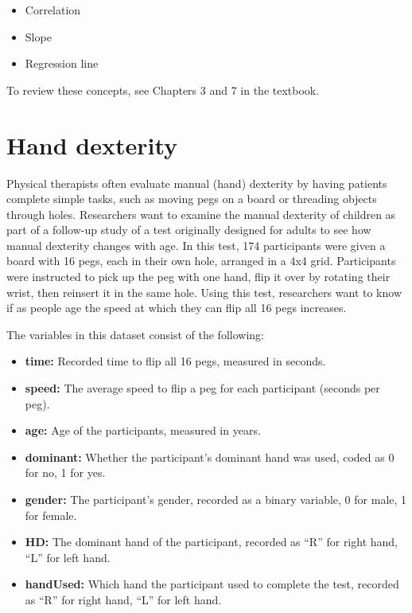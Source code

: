 \documentclass[
]{report}
\begin{document}
\begin{itemize}
\item
  Correlation
\item
  Slope
\item
  Regression line
\end{itemize}

To review these concepts, see Chapters 3 and 7 in the textbook.

\hypertarget{hand-dexterity-1}{%
\section{Hand dexterity}\label{hand-dexterity-1}}

Physical therapists often evaluate manual (hand) dexterity by having patients complete simple tasks, such as moving pegs on a board or threading objects through holes. Researchers want to examine the manual dexterity of children as part of a follow-up study of a test originally designed for adults to see how manual dexterity changes with age. In this test, 174 participants were given a board with 16 pegs, each in their own hole, arranged in a 4x4 grid. Participants were instructed to pick up the peg with one hand, flip it over by rotating their wrist, then reinsert it in the same hole. Using this test, researchers want to know if as people age the speed at which they can flip all 16 pegs increases.

The variables in this dataset consist of the following:

\begin{itemize}
\item
  \textbf{time:} Recorded time to flip all 16 pegs, measured in seconds.
\item
  \textbf{speed:} The average speed to flip a peg for each participant (seconds per peg).
\item
  \textbf{age:} Age of the participants, measured in years.
\item
  \textbf{dominant:} Whether the participant's dominant hand was used, coded as 0 for no, 1 for yes.
\item
  \textbf{gender:} The participant's gender, recorded as a binary variable, 0 for male, 1 for female.
\item
  \textbf{HD:} The dominant hand of the participant, recorded as ``R'' for right hand, ``L'' for left hand.
\item
  \textbf{handUsed:} Which hand the participant used to complete the test, recorded as ``R'' for right hand, ``L'' for left hand.
\end{itemize}
\end{document}
